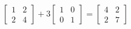 \documentclass[12 pt]{slides}
\begin{document}
\begingroup
\[\begin{bmatrix}1 & 2\\2 & 4\end{bmatrix} + 3\begin{bmatrix}1 & 0\\0 & 1\end{bmatrix} = \begin{bmatrix}4 & 2\\2 & 7\end{bmatrix}\]
\endgroup
\end{document}
